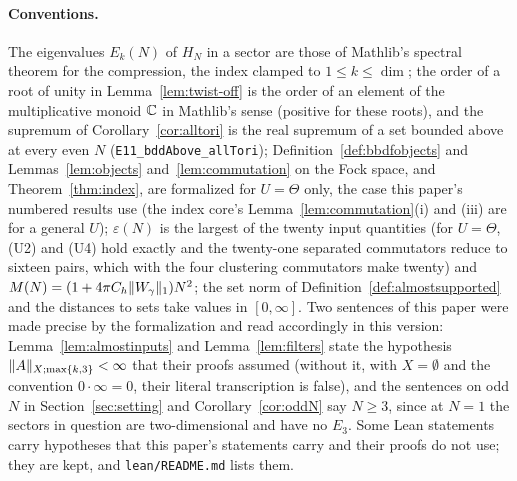\paragraph{Conventions.} The eigenvalues $E_k(N)$ of $H_N$ in a sector are those of Mathlib's spectral theorem for the
compression, the index clamped to $1\le k\le\dim$; the order of a root of unity in Lemma~\ref{lem:twist-off} is the order of
an element of the multiplicative monoid $\mathbb{C}$ in Mathlib's sense (positive for these roots), and the supremum of Corollary~\ref{cor:alltori} is the real supremum of a set bounded above at every even $N$
(\texttt{E11\_bddAbove\_allTori}); Definition~\ref{def:bbdfobjects} and Lemmas~\ref{lem:objects}
and~\ref{lem:commutation} on the Fock space, and Theorem~\ref{thm:index}, are formalized for $U=\Theta$ only, the case this
paper's numbered results use (the index core's Lemma~\ref{lem:commutation}(i) and (iii) are for a general $U$);
$\varepsilon(N)$ is the largest of the twenty input quantities (for $U=\Theta$, (U2) and (U4) hold exactly and the twenty-one
separated commutators reduce to sixteen pairs, which with the four clustering commutators make twenty) and $M(N)=(1+4\pi C_h\lVert W_\gamma\rVert_1)N^2$; the set norm
of Definition~\ref{def:almostsupported} and the distances
to sets take values in $[0,\infty]$. Two sentences of this paper were made precise by the formalization and read accordingly
in this version: Lemma~\ref{lem:almostinputs} and Lemma~\ref{lem:filters} state the hypothesis $\lVert A\rVert_{X;\max\{k,3\}}<\infty$
that their proofs assumed (without it, with $X=\emptyset$ and the convention $0\cdot\infty=0$, their literal transcription is
false), and the sentences on odd $N$ in Section~\ref{sec:setting} and Corollary~\ref{cor:oddN} say $N\ge3$, since at $N=1$ the
sectors in question are two-dimensional and have no $E_3$. Some Lean statements carry hypotheses that this paper's statements
carry and their proofs do not use; they are kept, and \texttt{lean/README.md} lists them.
